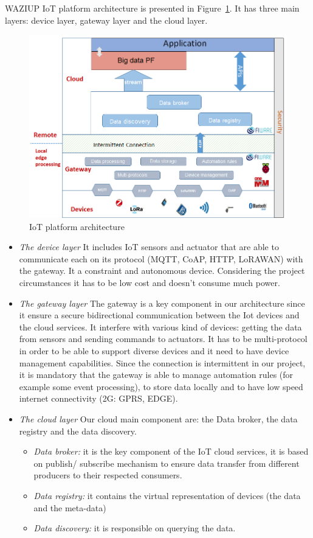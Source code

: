 WAZIUP IoT platform architecture is presented in Figure~\ref{fig:iotarchi}.
It has three main layers: device layer, gateway layer and the cloud layer.

\begin{figure}[h]
\centering
\includegraphics[width=\textwidth]{figs/iotarchi.png}
\caption{IoT platform architecture}
\label{fig:iotarchi}
\end{figure}

\begin{itemize}
  \item \emph{The device layer}
    It includes IoT sensors and actuator that are able to communicate each on its protocol (MQTT, CoAP, HTTP, LoRAWAN) with the gateway. 
It a constraint and autonomous device. 
Considering the project circumstances it has to be low cost and doesn’t consume much power.
  \item \emph{The gateway layer}
  The gateway is a key component in our architecture since it ensure a secure bidirectional communication between the Iot devices and the cloud services.
 It interfere with various kind of devices: getting the data from sensors and sending commands to actuators.
  It has to be multi-protocol in order to be able to support diverse devices and it need to have device management capabilities.
Since the connection is intermittent in our project, it is mandatory that the gateway is able to manage automation rules (for example some event processing), to store data locally and to have low speed internet connectivity (2G: GPRS, EDGE).
  \item \emph{The cloud layer}
  Our cloud main component are: the Data broker, the data registry and the data discovery.
\begin{itemize}
  \item \emph{Data broker:}
    it is the key component of the IoT cloud services, it is based on publish/ subscribe mechanism to ensure data transfer from different producers to their respected consumers.
  \item \emph{Data registry:}
    it contains the virtual representation of devices (the data and the meta-data)
  \item \emph{Data discovery:} 
    it is responsible on querying the data.
\end{itemize}
\end{itemize}

